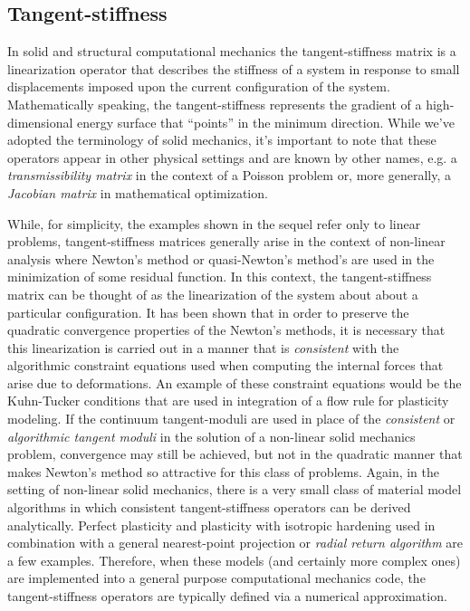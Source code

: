 \documentclass[preprint,12pt]{elsarticle}
\begin{document}
\subsection{Tangent-stiffness} 

In solid and structural computational mechanics the tangent-stiffness matrix is a linearization operator that describes the stiffness of a system in response to small displacements imposed upon the current configuration of the system.  Mathematically speaking, the tangent-stiffness represents the gradient of a high-dimensional energy surface that ``points'' in the minimum direction. While we've adopted the terminology of solid mechanics, it's important to note that these operators appear in other physical settings and are known by other names, e.g. a \emph{transmissibility matrix} in the context of a Poisson problem or, more generally, a \emph{Jacobian matrix} in mathematical optimization.

While, for simplicity, the examples shown in the sequel refer only to linear problems, tangent-stiffness matrices generally arise in the context of non-linear analysis where Newton's method or quasi-Newton's method's are used in the minimization of some residual function.  In this context, the tangent-stiffness matrix can be thought of as the linearization of the system about about a particular configuration.  It has been shown \cite{hughes1978consistent, hughes1978unconditionally} that in order to preserve the quadratic convergence properties of the Newton's methods, it is necessary that this linearization is carried out in a manner that is \emph{consistent} with the algorithmic constraint equations used when computing the internal forces that arise due to deformations.  An example of these constraint equations would be the Kuhn-Tucker conditions \cite{simo1998} that are used in integration of a flow rule for plasticity modeling.  If the continuum tangent-moduli are used in place of the \emph{consistent} or \emph{algorithmic tangent moduli} in the solution of a non-linear solid mechanics problem, convergence may still be achieved, but not in the quadratic manner that makes Newton's method so attractive for this class of problems.  Again, in the setting of non-linear solid mechanics, there is a very small class of material model algorithms in which consistent tangent-stiffness operators can be derived analytically.  Perfect plasticity and plasticity with isotropic hardening used in combination with a general nearest-point projection or \emph{radial return algorithm} are a few examples.  Therefore, when these models (and certainly more complex ones) are implemented into a general purpose computational mechanics code, the tangent-stiffness operators are typically defined via a numerical approximation.
\end{document}
